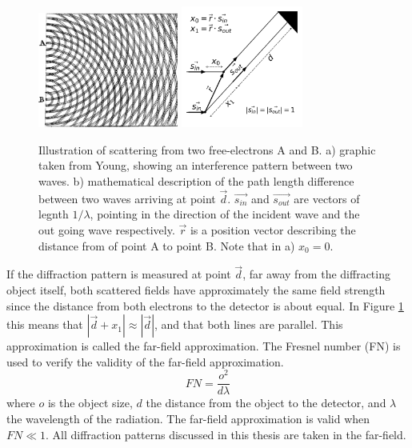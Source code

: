 \begin{figure}[h]\label{fig:Interference}
\centering 
\includegraphics[width=46mm]{Young_Diffraction2.png}
\includegraphics[width=40mm]{blah.png}

\caption{Illustration of scattering from two free-electrons A and B. a) graphic taken from Young, showing an interference pattern between two waves. b) mathematical description of the path length difference between two waves arriving at point $\vec{d}$. $\vec{s_{in}}$ and $\vec{s_{out}}$ are vectors of legnth $1/\lambda$, pointing in the direction of the incident wave and the out going wave respectively. $\vec{r}$ is a position vector describing the distance from of point A to point B. Note that in a) $x_0 = 0$.}
\end{figure}

If the diffraction pattern is measured at point \(\vec{d}\), far away from the diffracting object itself, both scattered fields have approximately the same field strength since the distance from both electrons to the detector is about equal. In Figure \ref{fig:Interference} this means that  $|\vec{d}+x_1| \approx |\vec{d}|$, and that both lines are parallel. This approximation is called the far-field approximation. The Fresnel number (FN) is used to verify the validity of the far-field approximation.
\begin{equation} 
FN = \frac{o^2}{d\lambda}
\end{equation}
where $o$ is the object size, $d$ the distance from the
object to the detector, and \(\lambda\) the
wavelength of the radiation. The far-field approximation is valid when $FN \ll 1$. All diffraction patterns discussed
in this thesis are taken in the far-field. 

